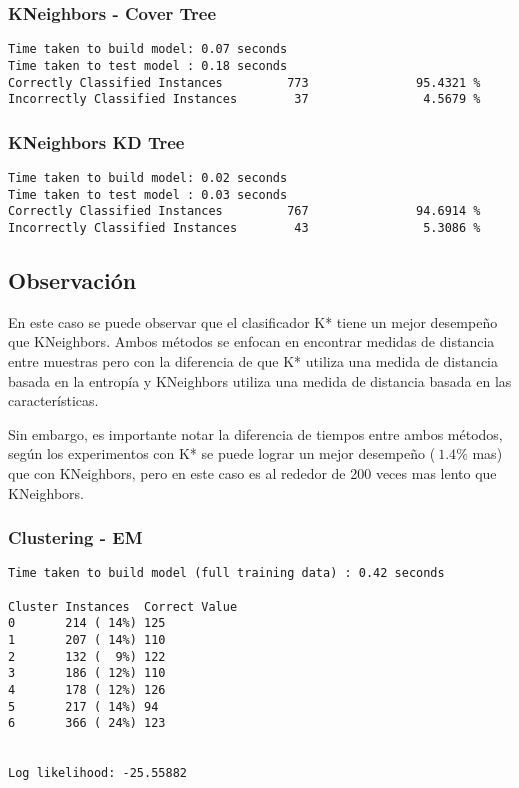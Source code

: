 \documentclass[a4paper]{article}
\begin{document}
\subsubsection{KNeighbors - Cover Tree}
\begin{verbatim}
Time taken to build model: 0.07 seconds
Time taken to test model : 0.18 seconds
Correctly Classified Instances         773               95.4321 %
Incorrectly Classified Instances        37                4.5679 %
\end{verbatim}

\subsubsection{KNeighbors KD Tree}

\begin{verbatim}
Time taken to build model: 0.02 seconds
Time taken to test model : 0.03 seconds
Correctly Classified Instances         767               94.6914 %
Incorrectly Classified Instances        43                5.3086 %
\end{verbatim}

\subsection*{Observación}
En este caso se puede observar que el clasificador K* tiene
un mejor desempeño que KNeighbors. Ambos métodos se enfocan
en encontrar medidas de distancia entre muestras pero con la
diferencia de que K* utiliza una medida de distancia basada
en la entropía y KNeighbors utiliza una medida de distancia
basada en las características.

Sin embargo, es importante notar la diferencia de tiempos
entre ambos métodos, según los experimentos con K* se puede
lograr un mejor desempeño ($~1.4\%$ mas) que con KNeighbors, pero
 en este caso es al rededor de 200 veces mas lento que KNeighbors.

\subsubsection{Clustering - EM}

\begin{verbatim}
Time taken to build model (full training data) : 0.42 seconds

Cluster Instances  Correct Value
0       214 ( 14%) 125
1       207 ( 14%) 110
2       132 (  9%) 122
3       186 ( 12%) 110
4       178 ( 12%) 126
5       217 ( 14%) 94
6       366 ( 24%) 123


Log likelihood: -25.55882

\end{verbatim}
\end{document}
